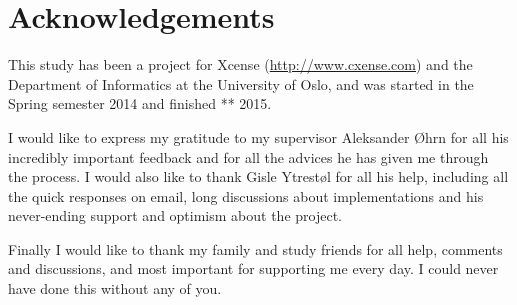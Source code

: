 \chapter*{Acknowledgements}
This study has been a project for Xcense (\url{http://www.cxense.com}) and the Department of Informatics at the University of Oslo, and was started in the Spring semester 2014 and finished ** 2015. 

I would like to express my gratitude to my supervisor Aleksander Øhrn for all his incredibly important feedback and for all the advices he has given me through the process. 
I would also like to thank Gisle Ytrestøl for all his help, including all the quick responses on email, long discussions about implementations and his never-ending support and optimism about the project. 

Finally I would like to thank my family and study friends for all help, comments and discussions, and most important for supporting me every day. I could never have done this without any of you. 